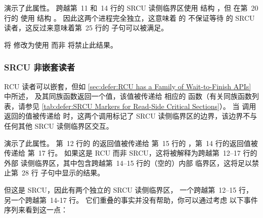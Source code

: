 \begin{listing}

\caption{SRCU 域}
\label{lst:memorder:SRCU Domains}
\end{listing}

演示了此属性。
 跨越第~11 和~14 行的 SRCU 读侧临界区使用
 结构 ，但  在第~20 行的
 使用  结构
。
因此这两个进程完全独立，这意味着
 的  不保证等待
 的 SRCU 读者，这反过来意味着第~25 行的 
子句可以被满足。

将  修改为使用  而非  将禁止此结果。

\subsubsection{SRCU 非嵌套读者}
\label{sec:memorder:SRCU Non-Nesting Readers}

RCU 读者可以嵌套，但如
\cref{sec:defer:RCU has a Family of Wait-to-Finish APIs}
中所述，
 及其同族函数返回一个值，该值被传递给
相应的  函数（有关同族函数列表，请参见
\cref{tab:defer:SRCU Markers for Read-Side Critical Sections}）。
当  调用返回的值被传递给
 时，这两个调用标记了 SRCU
读侧临界区的边界，该边界不与任何其他 SRCU
读侧临界区交互。

\begin{listing}

\caption{SRCU 读者不嵌套}
\label{lst:memorder:SRCU Readers Don't Nest}
\end{listing}

演示了此属性。
第~12 行的  的返回值被传递给
第~15 行的 ，第~14 行的返回值被传递给
第~17 行。
如果这是 RCU 而非 SRCU，这将被解释为跨越第~12--17 行的外部
读侧临界区，其中包含跨越第~14--15 行的（空的）内部
临界区，这将足以禁止第~28 行  子句中显示的结果。

但这是 SRCU，因此有两个独立的 SRCU 读侧临界区，
一个跨越第~12--15 行，另一个跨越第~14-17 行。
它们重叠的事实并没有帮助，你可以通过考虑
以下事件序列来看到这一点：

